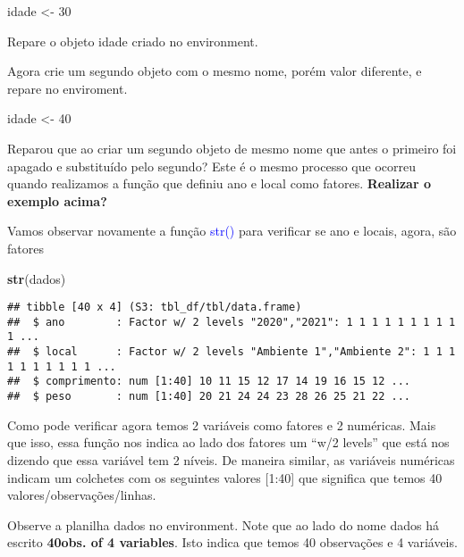 \documentclass[titlepage, oneside, openany, a4paper]{book}
\newenvironment{Shaded}{\begin{snugshade}}{\end{snugshade}}
\newcommand{\DecValTok}[1]{\textcolor[rgb]{0.00,0.00,0.81}{#1}}
\newcommand{\KeywordTok}[1]{\textcolor[rgb]{0.13,0.29,0.53}{\textbf{#1}}}
\newcommand{\NormalTok}[1]{#1}
\newcommand{\StringTok}[1]{\textcolor[rgb]{0.31,0.60,0.02}{#1}}
\begin{document}
\begin{Shaded}
\begin{Highlighting}[]
\NormalTok{idade <-}\StringTok{ }\DecValTok{30}
\end{Highlighting}
\end{Shaded}

Repare o objeto idade criado no environment.

Agora crie um segundo objeto com o mesmo nome, porém valor diferente, e repare no enviroment.

\begin{Shaded}
\begin{Highlighting}[]
\NormalTok{idade <-}\StringTok{ }\DecValTok{40}
\end{Highlighting}
\end{Shaded}

Reparou que ao criar um segundo objeto de mesmo nome que antes o primeiro foi apagado e substituído pelo segundo? Este é o mesmo processo que ocorreu quando realizamos a função que definiu ano e local como fatores.
\textbf{Realizar o exemplo acima?}

Vamos observar novamente a função \textcolor{blue}{str()} para verificar se ano e locais, agora, são fatores

\begin{Shaded}
\begin{Highlighting}[]
\KeywordTok{str}\NormalTok{(dados)}
\end{Highlighting}
\end{Shaded}

\begin{verbatim}
## tibble [40 x 4] (S3: tbl_df/tbl/data.frame)
##  $ ano        : Factor w/ 2 levels "2020","2021": 1 1 1 1 1 1 1 1 1 1 ...
##  $ local      : Factor w/ 2 levels "Ambiente 1","Ambiente 2": 1 1 1 1 1 1 1 1 1 1 ...
##  $ comprimento: num [1:40] 10 11 15 12 17 14 19 16 15 12 ...
##  $ peso       : num [1:40] 20 21 24 24 23 28 26 25 21 22 ...
\end{verbatim}

Como pode verificar agora temos 2 variáveis como fatores e 2 numéricas. Mais que isso, essa função nos indica ao lado dos fatores um ``w/2 levels'' que está nos dizendo que essa variável tem 2 níveis. De maneira similar, as variáveis numéricas indicam um colchetes com os seguintes valores {[}1:40{]} que significa que temos 40 valores/observações/linhas.

Observe a planilha dados no environment. Note que ao lado do nome dados há escrito \textbf{40obs. of 4 variables}. Isto indica que temos 40 observações e 4 variáveis.
\end{document}
